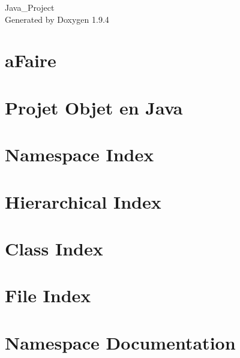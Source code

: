 \documentclass[twoside]{book}
\newcommand{\+}{\discretionary{\mbox{\scriptsize$\hookleftarrow$}}{}{}}
\newcommand{\clearemptydoublepage}{%
    \newpage{\pagestyle{empty}\cleardoublepage}%
  }
\begin{document}
  \raggedbottom
    \hypersetup{pageanchor=false,
                bookmarksnumbered=true,
                pdfencoding=unicode
               }
  \begin{titlepage}
  \vspace*{7cm}
  \begin{center}%
  {\Large Java\+\_\+\+Project}\\
  \vspace*{1cm}
  {\large Generated by Doxygen 1.9.4}\\
  \end{center}
  \end{titlepage}
  \clearemptydoublepage
  \tableofcontents
  \clearemptydoublepage
  \hypersetup{pageanchor=true}
\chapter{a\+Faire}
\label{md_a_faire}

\chapter{Projet Objet en Java}
\label{md__r_e_a_d_m_e}

\chapter{Namespace Index}

\chapter{Hierarchical Index}

\chapter{Class Index}

\chapter{File Index}

\chapter{Namespace Documentation}













\end{document}
